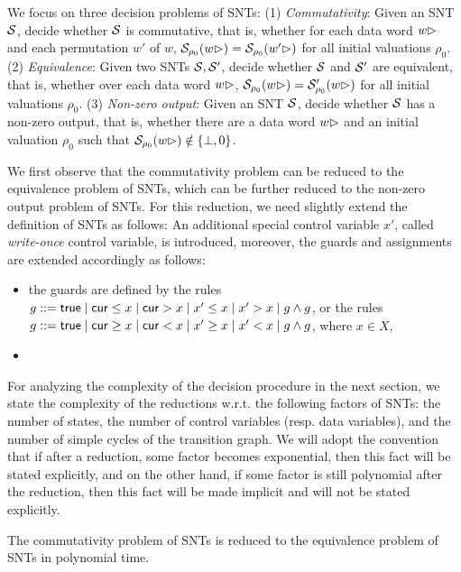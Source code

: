 We focus on three decision problems of SNTs: (1) \emph{Commutativity}: Given an SNT ${\mathcal{S} }$, decide whether ${\mathcal{S} }$ is commutative, that is, whether for each data word $w\rhd$ and each permutation $w'$ of $w$, ${\mathcal{S} }_{\rho_0}(w\rhd)={\mathcal{S} }_{\rho_0}(w'\rhd)$ for all initial valuations $\rho_0$. (2) \emph{Equivalence}: Given two SNTs ${\mathcal{S} },{\mathcal{S} }'$, decide whether ${\mathcal{S} }$ and ${\mathcal{S} }'$ are equivalent, that is, whether over each data word $w\rhd$, ${\mathcal{S} }_{\rho_0}(w\rhd)={\mathcal{S} }'_{\rho_0}(w\rhd)$ for all initial valuations $\rho_0$. (3) \emph{Non-zero output}: Given an SNT ${\mathcal{S} }$, decide whether ${\mathcal{S} }$ has a non-zero output, that is, whether there are a data word $w\rhd$ and an initial valuation $\rho_0$ such that ${\mathcal{S} }_{\rho_0}(w\rhd)\notin \{\bot, 0\}$. 

We first observe that the commutativity problem can be reduced to the equivalence problem of SNTs, which can be further reduced to the non-zero output problem of SNTs. For this reduction, we need slightly extend the definition of SNTs as follows: An additional special control variable $x'$, called \emph{write-once} control variable, is introduced, moreover, the guards and assignments are extended accordingly as follows:
\begin{itemize}
\item the guards are defined by the rules $g::= \mathsf{true} \mid \mathsf{cur} \le x \mid \mathsf{cur} > x \mid x' \le x \mid x' > x \mid g \wedge g$, or the rules $g::= \mathsf{true} \mid \mathsf{cur} \ge x \mid \mathsf{cur} < x \mid x' \ge x \mid x' < x \mid g \wedge g$, where $x \in X$,
\item
\end{itemize}

For analyzing the complexity of the decision procedure in the next section,  we state the complexity of the reductions w.r.t. the following factors of SNTs: the number of states, the number of control variables (resp. data variables), and the number of simple cycles of the transition graph. We will adopt the convention that if after a reduction, some factor becomes exponential, then this fact will be stated explicitly, and on the other hand, if some factor is still polynomial after the reduction, then this fact will be made implicit and will not be stated explicitly. 

\begin{proposition}\label{prop-snt-cmm-to-eqv}
The commutativity problem of SNTs is reduced to the equivalence problem of SNTs in polynomial time.
\end{proposition}

